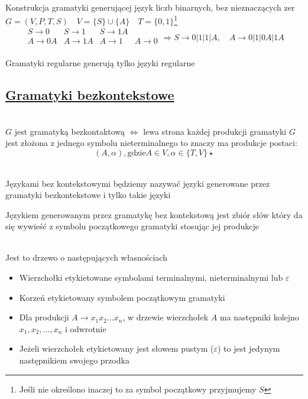 	\begin{przyklad}
		Konstrukcja gramatyki generującej język liczb binarnych, bez nieznaczących zer \\
		$G = (V, P, T, S) \quad V = \{S\} \cup \{A\} \quad T = \{0, 1\}$\footnote{Jeśli nie określono inaczej to 
		za symbol początkowy przyjmujemy $S$}
		$$
		\begin{matrix}
		S \to 0 & S \to 1 & S \to 1A \\
		A \to 0A & A \to 1A & A \to 1 & A \to 0\\		
		\end{matrix}
		\Rightarrow
		S \to 0|1|1|A, \quad A \to 0|1|0A|1A
		$$
	\end{przyklad}		
	
	\begin{tw}
		Gramatyki regularne generują tylko języki regularne
	\end{tw}
		
\subsection{\href{http://pl.wikipedia.org/wiki/Gramatyka_bezkontekstowa}{Gramatyki bezkontekstowe}}
	
	\begin{df}~\\
		$G$ jest gramatyką bezkontaktową $\Leftrightarrow$ lewa strona każdej produkcji gramatyki $G$ jest złożona z jednego symbolu
		nieterminalnego to znaczy ma produkcje postaci:
			$$
				(A, \alpha), \text{gdzie} A\in V, \alpha \in \{T,V\}\star
			$$
	\end{df}
	
	\begin{df}~\\
		Językami bez kontekstowymi będziemy nazywać języki generowane przez gramatyki bezkontekstowe i tylko takie języki		
		
		\begin{uwaga}
			Językiem generowanym przez gramatykę bez kontekstową jest zbiór słów który da się wywieść z symbolu początkowego gramatyki stosując
			jej produkcje
		\end{uwaga}
	\end{df}
	
	\begin{df}~\\
		Jest to drzewo o następujących własnościach
		\begin{itemize}
			\item Wierzchołki etykietowane symbolami terminalnymi, nieterminalnymi lub $\varepsilon$
			\item Korzeń etykietowany symbolem początkowym gramatyki
			\item Dla produkcji $A\rightarrow x_1x_2 \dots x_n$, w drzewie wierzchołek $A$ ma następniki 
			kolejno $x_1, x_2, ..., x_n$ i odwrotnie
			\item Jeżeli wierzchołek etykietowany jest słowem pustym ($\varepsilon$) to jest jedynym
			następnikiem swojego przodka
		\end{itemize}
	\end{df}

